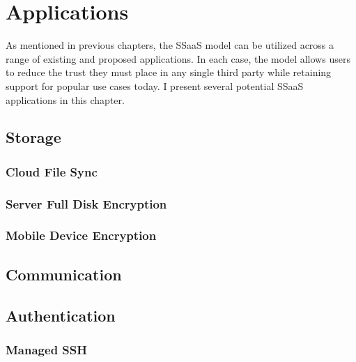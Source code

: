 \chapter{Applications}
\label{chap:apps}

As mentioned in previous chapters, the SSaaS model can be utilized
across a range of existing and proposed applications. In each case,
the model allows users to reduce the trust they must place in any
single third party while retaining support for popular use cases
today. I present several potential SSaaS applications in this
chapter.

\section{Storage}

\subsection{Cloud File Sync}

\subsection{Server Full Disk Encryption}

\subsection{Mobile Device Encryption}

\section{Communication}



\section{Authentication}

\subsection{Managed SSH}

